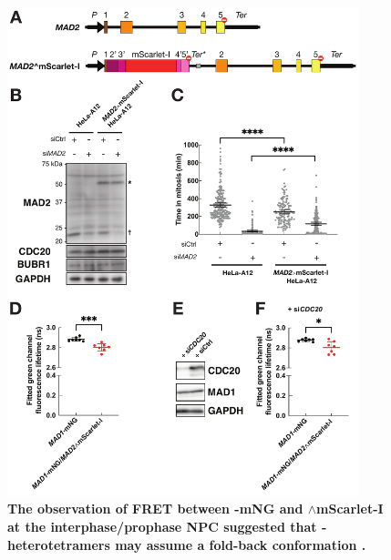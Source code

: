 \begin{figure}
    \centering
    \includegraphics[width=0.91\textwidth]{chapters/figures/InternallyTaggedMAD2+NPCFLIM.pdf}
    \caption{\textbf{The observation of FRET between -mNG and $\wedge$mScarlet-I at the interphase/prophase NPC suggested that - heterotetramers may assume a fold-back conformation .}}
    \label{InternallyTaggedMAD2+NPCFLIM}
\end{figure}
